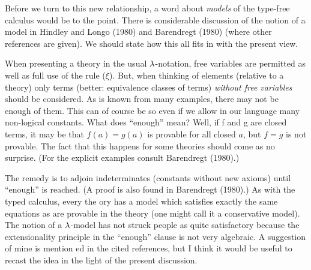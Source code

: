 Before we turn to this new relationship, a word about {\it models} of the type-free
calculus would be to the point. There is considerable discussion of the notion of a model
in Hindley and Longo (1980) and Barendregt (1980) (where other references are given). We
should state how this all fits in with the present view.

When presenting a theory in the usual $\lambda$-notation, free variables are permitted as well
as full use of the rule ($\xi$). But, when thinking of elements (relative to a theory)
only terms (better: equivalence classes of terms) {\it without free variables} should be
considered. As is known from many examples, there may not be enough of them. This can of
course be so even if we allow in our language many non-logical constants. What does
``enough'' mean? Well, if f and g are closed terms, it may be that $f(a) = g(a)$ is
provable for all closed $a$, but $f = g$ is not provable. The fact that this happens for
some theories should come as no surprise. (For the explicit examples consult Barendregt
(1980).)

The remedy is to adjoin indeterminates (constants without new axioms) until ``enough'' is
reached. (A proof is also found in Barendregt (1980).) As with the typed calculus, every
the ory has a model which satisfies exactly the same equations as are provable in the
theory (one might call it a conservative model). The notion of a $\lambda$-model has not struck
people as quite satisfactory because the extensionality principle in the ``enough'' clause
is not very algebraic. A suggestion of mine is mention ed in the cited references, but I
think it would be useful to recast the idea in the light of the present discussion.

